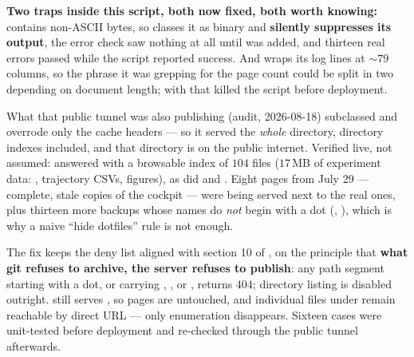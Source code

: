 \noindent \textbf{Two traps inside this script, both now fixed, both worth
knowing:}  contains non-ASCII bytes, so  classes it
as binary and \textbf{silently suppresses its output}, the error check saw
nothing at all until  was added, and thirteen real errors passed while
the script reported success. And  wraps its log lines at
$\sim79$ columns, so the phrase it was grepping for the page count could be
split in two depending on document length; with  that killed the
script before deployment.

\begin{trapbox}{What that public tunnel was also publishing (audit, 2026-08-18)}
 subclassed  and overrode
only the cache headers --- so it served the \emph{whole} directory, directory
indexes included, and that directory is on the public internet. Verified
live, not assumed:
 answered  with
a browsable index of $104$ files ($17$\,MB of experiment data: ,
trajectory CSVs, figures), as did  and . Eight
 pages from July 29 --- complete, stale copies of
the cockpit --- were being served next to the real ones, plus thirteen more
backups whose names do \emph{not} begin with a dot
(, ), which
is why a naive ``hide dotfiles'' rule is not enough.

The fix keeps the deny list aligned with section 10 of , on
the principle that \textbf{what git refuses to archive, the server refuses to
publish}: any path segment starting with a dot, or carrying ,
,  or , returns $404$; directory listing is
disabled outright.  still serves , so
pages are untouched, and individual files under  remain
reachable by direct URL --- only enumeration disappears. Sixteen cases were
unit-tested before deployment and re-checked through the public tunnel
afterwards.
\end{trapbox}


